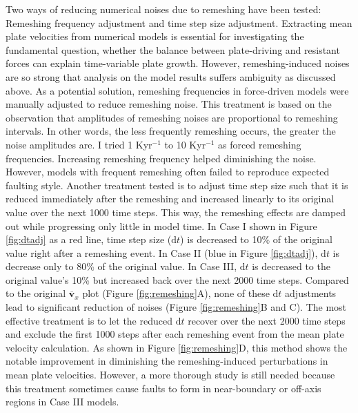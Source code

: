 \documentclass[letterpaper,12pt,notitle]{memphisthesis}                     %
\begin{document}
Two ways of reducing numerical noises due to remeshing have been tested: Remeshing frequency adjustment and time step size adjustment.
Extracting mean plate velocities from numerical models is essential for investigating the fundamental question, whether the balance between plate-driving and resistant forces can explain time-variable plate growth. However, remeshing-induced noises are so strong that analysis on the model results suffers ambiguity as discussed above. As a potential solution, remeshing frequencies in force-driven models were manually adjusted to reduce remeshing noise. This treatment is based on the observation that amplitudes of remeshing noises %
are proportional to remeshing intervals. In other words, the less frequently remeshing occurs, the greater the noise amplitudes are. I tried 1 Kyr$^{-1}$ to 10 Kyr$^{-1}$ as forced remeshing frequencies. Increasing remeshing frequency helped diminishing the noise. However, models with frequent remeshing often failed to reproduce expected faulting style. Another treatment tested is to adjust time step size such that it is reduced immediately after the remeshing and increased linearly to its original value over the next 1000 time steps. This way, the remeshing effects are damped out while progressing only little in model time. In Case I shown in Figure \ref{fig:dtadj} as a red line, time step size ($\text{d}t$) is decreased to 10\% of the original value right after a remeshing event. In Case II (blue in Figure \ref{fig:dtadj}), $\text{d}t$ is decrease only to 80\% of the original value. In Case III, $\text{d}t$ is decreased to the original value\rq{}s 10\% but increased back over the next 2000 time steps. Compared to the original $\overline{\boldsymbol{v}}_{x}$ plot (Figure \ref{fig:remeshing}A), none of these $\text{d}t$ adjustments lead to significant reduction of noises (Figure \ref{fig:remeshing}B and C). %
The most effective treatment is to let the reduced $\text{d}t$ recover over the next 2000 time steps and exclude the first 1000 steps after each remeshing event from the mean plate velocity calculation. As shown in Figure \ref{fig:remeshing}D, this method shows the notable improvement in diminishing the remeshing-induced perturbations in mean plate velocities. However, a more thorough study is still needed because this treatment sometimes cause faults to form in near-boundary or off-axis regions in Case III models.
%
\end{document}
